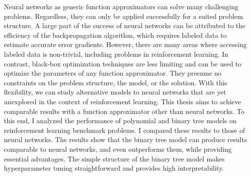 
Neural networks as generic function approximators can solve many challenging problems. Regardless, they can only be applied successfully for a suited problem structure. A large part of the success of neural networks can be attributed to the efficiency of the backpropagation algorithm, which requires labeled data to estimate accurate error gradients. However, there are many areas where accessing labeled data is non-trivial, including problems in reinforcement learning. In contrast, black-box optimization techniques are less limiting and can be used to optimize the parameters of any function approximator. They presume no constraints on the problem structure, the model, or the solution. With this flexibility, we can study alternative models to neural networks that are yet unexplored in the context of reinforcement learning. This thesis aims to achieve comparable results with a function approximator other than neural networks. To this end, I analyzed the performance of polynomial and binary tree models on reinforcement learning benchmark problems. I compared these results to those of neural networks. The results show that the binary tree model can produce results comparable to neural networks, and even outperforms them, while providing essential advantages. The simple structure of the binary tree model makes hyperparameter tuning straightforward and provides high interpretability.
